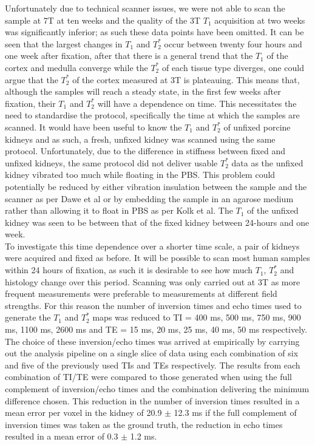 Unfortunately due to technical scanner issues, we were not able to scan the sample at 7T at ten weeks and the quality of the 3T $T_1$ acquisition at two weeks was significantly inferior; as such these data points have been omitted. It can be seen that the largest changes in $T_1$ and $T_2^*$ occur between twenty four hours and one week after fixation, after that there is a general trend that the $T_1$ of the cortex and medulla converge while the $T_2^*$ of each tissue type diverges, one could argue that the $T_2^*$ of the cortex measured at 3T is plateauing. This means that, although the samples will reach a steady state, in the first few weeks after fixation, their $T_1$ and $T_2^*$ will have a dependence on time. This necessitates the need to standardise the protocol, specifically the time at which the samples are scanned. It would have been useful to know the $T_1$ and $T_2^*$ of unfixed porcine kidneys and as such, a fresh, unfixed kidney was scanned using the same protocol. Unfortunately, due to the difference in stiffness between fixed and unfixed kidneys, the same protocol did not deliver usable $T_2^*$ data as the unfixed kidney vibrated too much while floating in the \ac{PBS}. This problem could potentially be reduced by either vibration insulation between the sample and the scanner as per Dawe et al \cite{dawe_postmortem_nodate} or by embedding the sample in an agarose medium rather than allowing it to float in \ac{PBS} as per Kolk et al\cite{kolk_imaging_2014}. The $T_1$ of the unfixed kidney was seen to be between that of the fixed kidney between 24-hours and one week.\\

To investigate this time dependence over a shorter time scale, a pair of kidneys were acquired and fixed as before. It will be possible to scan most human samples within 24 hours of fixation, as such it is desirable to see how much $T_1$, $T_2^*$ and histology change over this period. Scanning was only carried out at 3T as more frequent measurements were preferable to measurements at different field strengths. For this reason the number of inversion times and echo times used to generate the $T_1$ and $T_2^*$ maps was reduced to \ac{TI} = 400 ms, 500 ms, 750 ms, 900 ms, 1100 ms, 2600 ms and \ac{TE} = 15 ms, 20 ms, 25 ms, 40 ms, 50 ms respectively. The choice of these inversion/echo times was arrived at empirically by carrying out the analysis pipeline on a single slice of data using each combination of six and five of the previously used \ac{TI}s and \ac{TE}s respectively. The results from each combination of \ac{TI}/\ac{TE} were compared to those generated when using the full complement of inversion/echo times and the combination delivering the minimum difference chosen. This reduction in the number of inversion times resulted in a mean error per voxel in the kidney of 20.9 $\pm$ 12.3 ms if the full complement of inversion times was taken as the ground truth, the reduction in echo times resulted in a mean error of 0.3 $\pm$ 1.2 ms.\\

